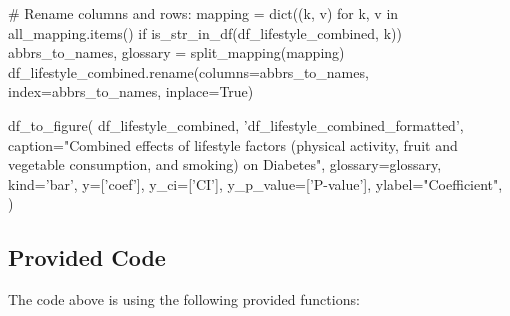 \documentclass[11pt]{article}
\begin{document}
\begin{python}
# Rename columns and rows:
mapping = dict((k, v) for k, v in all_mapping.items() if is_str_in_df(df_lifestyle_combined, k))
abbrs_to_names, glossary = split_mapping(mapping)
df_lifestyle_combined.rename(columns=abbrs_to_names, index=abbrs_to_names, inplace=True)

df_to_figure(
    df_lifestyle_combined, 'df_lifestyle_combined_formatted',
    caption="Combined effects of lifestyle factors (physical activity, fruit and vegetable consumption, and smoking) on Diabetes", 
    glossary=glossary,
    kind='bar',
    y=['coef'],
    y_ci=['CI'],
    y_p_value=['P-value'],
    ylabel="Coefficient",
)

\end{python}

\subsection{Provided Code}
The code above is using the following provided functions:
\end{document}
